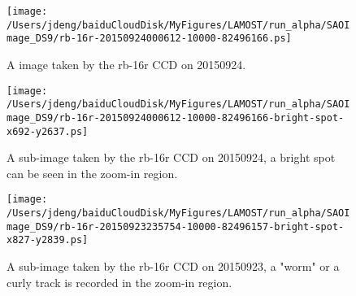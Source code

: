 \documentclass[12pt,twoside,letterpaper]{article}
\begin{document}
   \begin{figure}[!htbp]
   \begin{center}
       \texttt{[image: /Users/jdeng/baiduCloudDisk/MyFigures/LAMOST/run\_alpha/SAOImage\_DS9/rb-16r-20150924000612-10000-82496166.ps]}
       \caption{A image taken by the rb-16r CCD on 20150924.}
       \label{Fig:ImageDS9_rb_16r}
   \end{center}    
   \end{figure}

   \begin{figure}[!htbp]
   \begin{center}
       \texttt{[image: /Users/jdeng/baiduCloudDisk/MyFigures/LAMOST/run\_alpha/SAOImage\_DS9/rb-16r-20150924000612-10000-82496166-bright-spot-x692-y2637.ps]}
       \caption{A sub-image taken by the rb-16r CCD on 20150924, a bright spot
       can be seen in the zoom-in region.}
       \label{Fig:ImageDS9_rb_16r_spot}
   \end{center}    
   \end{figure}

   \begin{figure}[!htbp]
   \begin{center}
       \texttt{[image: /Users/jdeng/baiduCloudDisk/MyFigures/LAMOST/run\_alpha/SAOImage\_DS9/rb-16r-20150923235754-10000-82496157-bright-spot-x827-y2839.ps]}
       \caption{A sub-image taken by the rb-16r CCD on 20150923, a
       "worm" or a curly track is recorded in the zoom-in region.}
       \label{Fig:ImageDS9_rb_16r_epairs}
   \end{center}    
   \end{figure}
\end{document}
